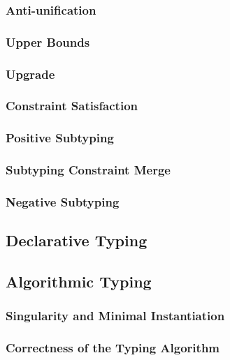 \subsubsection{Anti-unification}


\subsubsection{Upper Bounds}
\label{sec:alg-upper-bounds-proofs}


\subsubsection{Upgrade}
\label{sec:upgrade-lemmas}


\subsubsection{Constraint Satisfaction}


\subsubsection{Positive Subtyping}


\subsubsection{Subtyping Constraint Merge}


\subsubsection{Negative Subtyping}


\subsection{Declarative Typing}


\subsection{Algorithmic Typing}

\subsubsection{Singularity and Minimal Instantiation}


\subsubsection{Correctness of the Typing Algorithm}

